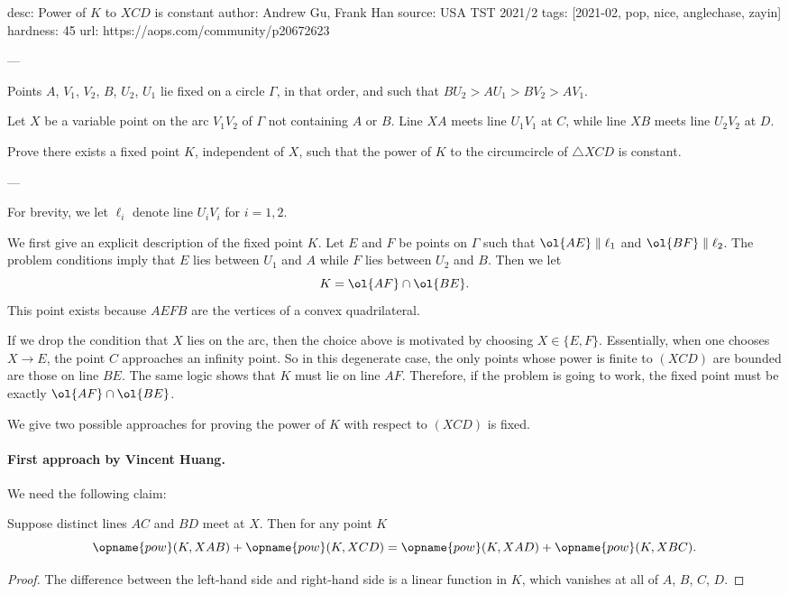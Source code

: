 desc: Power of $K$ to $XCD$ is constant
author: Andrew Gu, Frank Han
source: USA TST 2021/2
tags: [2021-02, pop, nice, anglechase, zayin]
hardness: 45
url: https://aops.com/community/p20672623

---

Points $A$, $V_1$, $V_2$, $B$, $U_2$, $U_1$
lie fixed on a circle $\Gamma$, in that order,
and such that $BU_2 > AU_1 > BV_2 > AV_1$.

Let $X$ be a variable point on the arc $V_1 V_2$ of $\Gamma$
not containing $A$ or $B$.
Line $XA$ meets line $U_1 V_1$ at $C$,
while line $XB$ meets line $U_2 V_2$ at $D$.

Prove there exists a fixed point $K$, independent of $X$,
such that the power of $K$ to the circumcircle
of $\triangle XCD$ is constant.

---

For brevity, we let $\ell_i$ denote line $U_iV_i$ for $i=1,2$.

We first give an explicit description of the fixed point $K$.
Let $E$ and $F$ be points on $\Gamma$ such that $\ol{AE} \parallel \ell_1$
and $\ol{BF} \parallel \ell_2$.
The problem conditions imply that $E$ lies between $U_1$ and $A$
while $F$ lies between $U_2$ and $B$.
Then we let \[ K = \ol{AF} \cap \ol{BE}. \]
This point exists because $AEFB$ are the vertices
of a convex quadrilateral.

\begin{remark*}
  If we drop the condition that $X$ lies on the arc,
  then the choice above is motivated by choosing $X \in \{E,F\}$.
  Essentially, when one chooses $X \to E$,
  the point $C$ approaches an infinity point.
  So in this degenerate case, the only points whose
  power is finite to $(XCD)$ are bounded are those on line $BE$.
  The same logic shows that $K$ must lie on line $AF$.
  Therefore, if the problem is going to work,
  the fixed point must be exactly $\ol{AF} \cap \ol{BE}$.
\end{remark*}

We give two possible approaches for proving the power
of $K$ with respect to $(XCD)$ is fixed.

\paragraph{First approach by Vincent Huang.}
We need the following claim:
\begin{claim*}
  Suppose distinct lines $AC$ and $BD$ meet at $X$.
  Then for any point $K$
  \[ \opname{pow}(K, XAB) + \opname{pow}(K, XCD)
    = \opname{pow}(K, XAD) + \opname{pow}(K, XBC). \]
\end{claim*}
\begin{proof}
  The difference between the left-hand side and right-hand
  side is a linear function in $K$,
  which vanishes at all of $A$, $B$, $C$, $D$.
\end{proof}

